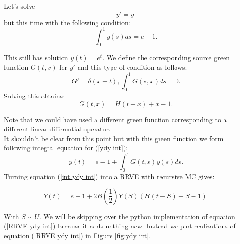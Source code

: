 \documentclass[a4paper,12pt]{article}
\begin{document}
\begin{example}[$y'=y$]
    Let's solve
    \begin{equation} \label{ydy int}
        y'=y.
    \end{equation}
    but this time with the following condition:
    \begin{equation}
        \int_{0}^{1} y(s) ds = e-1.
    \end{equation}

    This still has solution $y(t)=e^{t}$. We define the corresponding source
    green function $G(t,x)$ for $y'$ and this type of condition as follows:
    \begin{equation}
        G'= \delta(x-t), \int_{0}^{1}G(s,x)ds = 0.
    \end{equation}
    Solving this obtains:
    \begin{equation}
        G(t,x) = H(t-x) +x-1.
    \end{equation}

    Note that we could have used a different green function corresponding
    to a different linear differential operator. \\

    It shouldn't be clear from this point but with this green
    function we form following integral equation for (\ref{ydy int}):
    \begin{equation} \label{int ydy int}
        y(t)= e -1 + \int_{0}^{1}G(t,s)y(s)ds.
    \end{equation}
    Turning equation (\ref{int ydy int}) into a RRVE with recursive MC gives:

    \begin{equation}\label{RRVE ydy int}
        Y(t)= e-1 + 2B\left(\frac{1}{2} \right)Y(S)(H(t-S)+S-1) .
    \end{equation}

    With $S \sim U$. We will be skipping over the python implementation of equation (\ref{RRVE ydy int})
    because it adds nothing new.
    Instead we plot realizations of equation (\ref{RRVE ydy int}) in Figure \ref{fig:ydy int}.


\end{example}
\end{document}
